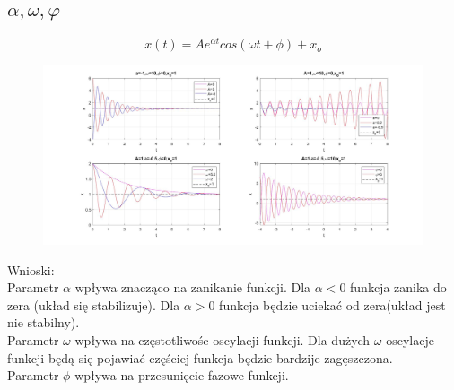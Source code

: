 \documentclass{article}
\begin{document}
\subsection{$\alpha,\omega,\varphi$}
$$
x(t)=Ae^{\alpha t}cos(\omega t + \phi)+x_o
$$
\begin{figure}[h]
    \centering
    \includegraphics[width=1.2\textwidth]{b_wykresy.jpg}
    \label{fig:my_label}
\end{figure}
\begin{flushleft}
Wnioski:\\
Parametr $\alpha$ wpływa znacząco na zanikanie funkcji. Dla $\alpha < 0$ funkcja zanika do zera (układ się stabilizuje). Dla $\alpha > 0$ funkcja będzie uciekać od zera(układ jest nie stabilny).\\
Parametr $\omega$ wpływa na częstotliwośc oscylacji funkcji. Dla dużych $\omega$ oscylacje funkcji będą się pojawiać częściej funkcja będzie bardzije zagęszczona. \\
Parametr $\phi$ wpływa na przesunięcie fazowe funkcji. \\
\end{flushleft}
\end{document}
